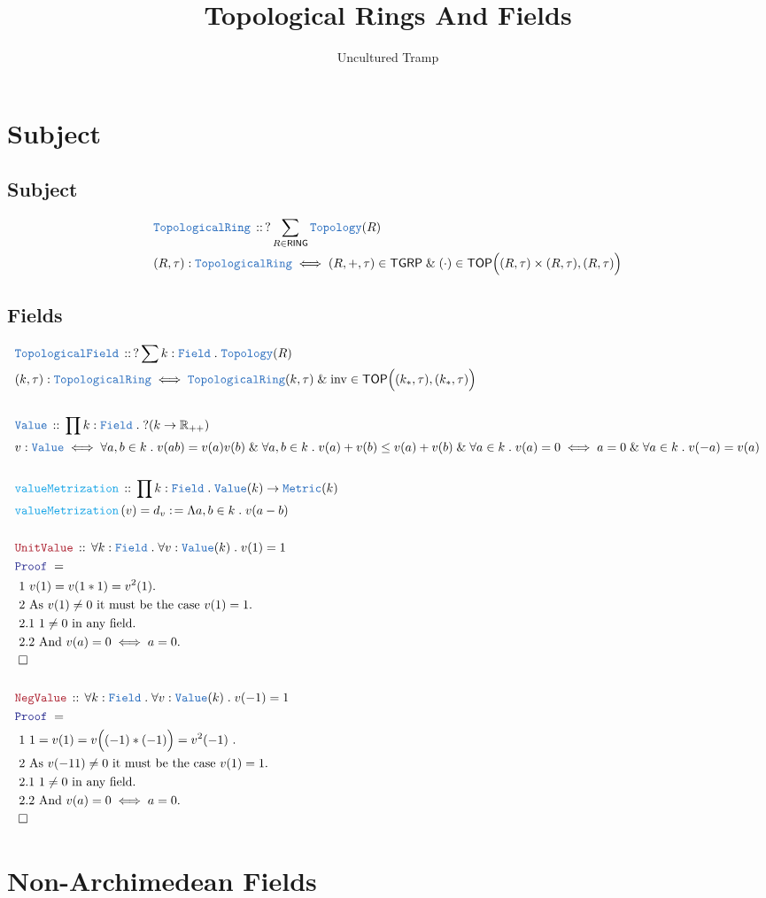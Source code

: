 \documentclass[12pt]{scrartcl}
\title{Topological Rings And Fields}
\author{Uncultured Tramp}
\newcommand{\TYPE}[1]{\textcolor{NavyBlue}{\mathtt{#1}}}
\newcommand{\FUNC}[1]{\textcolor{Cerulean}{\mathtt{#1}}}
\newcommand{\LOGIC}[1]{\textcolor{Blue}{\mathtt{#1}}}
\newcommand{\THM}[1]{\textcolor{Maroon}{\mathtt{#1}}}
\renewcommand{\.}{\; . \;}
\newcommand{\de}{: \kern 0.1pc =}
\newcommand{\Act}[1]{\left( #1 \right)}
\newcommand{\Theorem}[2]{& \THM{#1} \, :: \, #2 \\ & \Proof = \\ }
\newcommand{\DeclareType}[2]{& \TYPE{#1} \, :: \, #2 \\}
\newcommand{\DefineType}[3]{& #1 : \TYPE{#2} \iff #3 \\}
\newcommand{\DeclareFunc}[2]{& \FUNC{#1} \, :: \, #2 \\}
\newcommand{\DefineNamedFunc}[4]{&  \FUNC{#1}\Act{#2} = #3 \de #4 \\}
\newcommand{\Page}[1]{ \begin{align*} #1 \end{align*}   }
\newcommand{\Explain}[1]{& \text{#1.} \\}
\renewcommand{\And}{\; \& \;}
\newcommand{\Reals}{\mathbb{R} }
\newcommand{\QED}{\; \square}
\newcommand{\EndProof}{& \QED \\}
\newcommand{\Proof}{\LOGIC{Proof} \; }
\newcommand{\Top}{\TYPE{Topology}}
\newcommand{\TOP}{\mathsf{TOP}}
\newcommand{\RING}{\mathsf{RING}}
\newcommand{\Field}{\TYPE{Field}}
\newcommand{\inv}{\mathrm{inv}}
\newcommand{\TGRP}{\mathsf{TGRP}}
\begin{document}
\maketitle
\newpage
\tableofcontents
\newpage
\section{Subject}
\subsection{Subject}
\Page{
	\DeclareType{TopologicalRing}{?\sum_{R \in \RING} \Top(R)}
	\DefineType{(R,\tau)}{TopologicalRing}{
		(R,+,\tau) \in \TGRP \And
		(\cdot) \in \TOP\Big( (R,\tau) \times (R,\tau), (R,\tau) \Big)	
	}
}
\newpage
\subsection{Fields}
\Page{
	\DeclareType{TopologicalField}{?\sum k : \Field \. \Top(R)}
	\DefineType{(k,\tau)}{TopologicalRing}{
		\TYPE{TopologicalRing}(k,\tau)  \And
		\inv \in \TOP\Big( (k_*,\tau) , (k_*,\tau) \Big)	
	}
	\\
	\DeclareType{Value}{\prod k : \Field \. ?(k \to \Reals_{++}) }
	\DefineType{v}{Value}
	{    
				\forall a,b \in k \.  v(ab) = v(a)v(b)
				\And
				\forall a,b \in k  \. v(a) + v(b) \le v(a) + v(b)
				\And
				\forall a \in k \. v(a) = 0 \iff a = 0
				\And
				\forall a \in k \. v(-a) = v(a) 
	}
	\\
	\DeclareFunc{valueMetrization}
	{
		\prod k : \Field \. \TYPE{Value}(k) \to \TYPE{Metric}(k)
	}
	\DefineNamedFunc{valueMetrization}{v}{d_v}
	{
		\Lambda a,b \in k \.  v(a - b)	
	}
	\\
	\Theorem{UnitValue}{ 
		\forall k : \Field \. 
		\forall v : \TYPE{Value}(k) \.
		v(1) = 1
	}
	\Explain{ 1 
	    $v(1)  = v(1 * 1) = v^2(1)$}
	 \Explain{ 2
	 	As $v(1) \neq 0$ it must be the case $v(1) = 1$}
	 \Explain{ 2.1
	 	$1 \neq 0$ in any field}
	 \Explain{ 2.2
	 	And  $v(a) = 0 \iff a = 0$}
	 \EndProof
	 \\
	 \Theorem{NegValue}{ 
		\forall k : \Field \. 
		\forall v : \TYPE{Value}(k) \.
		v(-1) = 1
	}
	\Explain{ 1 
		 $1 = v(1) = v\Big((-1)*(-1)\Big) =  v^2(-1)$	  
	  }
	  \Explain{ 2
	 	As $v(-11) \neq 0$ it must be the case $v(1) = 1$}
	 \Explain{ 2.1
	 	$1 \neq 0$ in any field}
	 \Explain{ 2.2
	 	And  $v(a) = 0 \iff a = 0$}
	 \EndProof
}
\newpage
\section{Non-Archimedean Fields}
\end{document}

